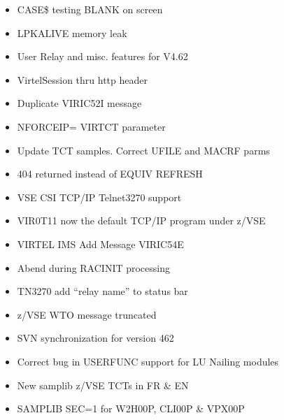 \documentclass[letterpaper,10pt,english]{sphinxmanual}
\begin{document}
\begin{itemize}
\item {} 
 CASE\$ testing BLANK on screen

\item {} 
 LPKALIVE memory leak

\item {} 
 User Relay and misc. features for V4.62

\item {} 
 VirtelSession thru http header

\item {} 
 Duplicate VIRIC52I message

\item {} 
 NFORCEIP= VIRTCT parameter

\item {} 
 Update TCT samples. Correct UFILE and MACRF parms

\item {} 
 404 returned instead of EQUIV REFRESH

\item {} 
 VSE CSI TCP/IP Telnet3270 support

\item {} 
 VIR0T11 now the default TCP/IP program under z/VSE

\item {} 
 VIRTEL IMS \sphinxhyphen{} Add Message VIRIC54E

\item {} 
 Abend during RACINIT processing

\item {} 
 TN3270 add “relay name” to status bar

\item {} 
 z/VSE WTO message truncated

\item {} 
 SVN synchronization for version 462

\item {} 
 Correct bug in USERFUNC support for LU Nailing modules

\item {} 
 New samplib z/VSE TCTs in FR \& EN

\item {} 
 SAMPLIB SEC=1 for W2H\sphinxhyphen{}00P, CLI\sphinxhyphen{}00P \& VPX\sphinxhyphen{}00P


\end{itemize}
\end{document}
